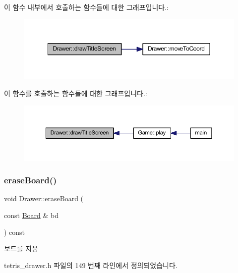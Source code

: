이 함수 내부에서 호출하는 함수들에 대한 그래프입니다.\+:
\nopagebreak
\begin{figure}[H]
\begin{center}
\leavevmode
\includegraphics[width=349pt]{class_drawer_ad87ca95db3cafee6f005e297e2c6d4de_cgraph}
\end{center}
\end{figure}
이 함수를 호출하는 함수들에 대한 그래프입니다.\+:
\nopagebreak
\begin{figure}[H]
\begin{center}
\leavevmode
\includegraphics[width=350pt]{class_drawer_ad87ca95db3cafee6f005e297e2c6d4de_icgraph}
\end{center}
\end{figure}
\mbox{\label{class_drawer_ad8b55aff1fbf975536ef3d995d3a4526}} 
\subsubsection{\texorpdfstring{erase\+Board()}{eraseBoard()}}
{\footnotesize\ttfamily void Drawer\+::erase\+Board (\begin{DoxyParamCaption}\item[{const \mbox{\hyperlink{class_board}{Board}} \&}]{bd }\end{DoxyParamCaption}) const\hspace{0.3cm}{\ttfamily [inline]}}



보드를 지움 



tetris\+\_\+drawer.\+h 파일의 149 번째 라인에서 정의되었습니다.


